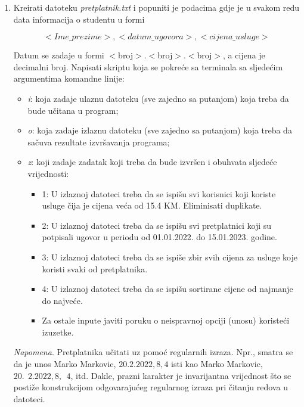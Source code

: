 \begin{enumerate}
   \item Kreirati datoteku \emph{pretplatnik.txt} i popuniti je podacima gdje je u svakom redu
   data informacija o studentu u formi
   
   $$<Ime\_prezime>, <datum\_ugovora>, <cijena\_usluge>$$
   
   Datum se zadaje u formi $<$broj$>$.$<$broj$>$.$<$broj$>$, a cijena je decimalni broj. Napisati 
   skriptu koja se pokreće sa terminala sa sljedećim argumentima komandne linije:
   \begin{itemize}
   	\item \textit{i}: koja zadaje ulaznu datoteku (sve zajedno sa putanjom) koja treba da bude učitana
   u program;
   \item \textit{o}: koja zadaje izlaznu datoteku (sve zajedno sa putanjom) koja treba da sačuva
   rezultate izvršavanja programa;
    \item \textit{z}: koji zadaje zadatak koji treba da bude izvršen i obuhvata sljedeće vrijednosti:
    \begin{itemize}
    	\item  1: U izlaznoj datoteci treba da se ispišu svi korisnici koji koriste usluge čija je  cijena veća od 15.4 KM. Eliminisati duplikate. 
        \item 2: U izlaznoj datoteci treba da se ispišu svi pretplatnici koji su potpisali ugovor u periodu od 01.01.2022. do 15.01.2023. godine.
        \item  3: U izlaznoj datoteci treba da se ispiše zbir svih cijena za usluge koje koristi svaki od pretplatnika. 
        \item 4: U izlaznoj datoteci treba da se ispišu sortirane cijene od najmanje do  najveće.
        \item Za ostale inpute javiti poruku o neispravnoj opciji  (unosu) koristeći izuzetke.
         \end{itemize}
   \end{itemize}
   \textit{Napomena}. Pretplatnika učitati uz pomoć regularnih izraza. Npr., smatra se da je unos Marko
   Markovic, $20.2.2022, 8,4$ isti kao Marko Markovic, $20.\ \ 2.2022, 8,\ \ 4$, itd. Dakle, prazni
   karakter je invarijantna vrijednost što se postiže konstrukcijom odgovarajućeg regularnog izraza
   pri čitanju redova u datoteci.
\end{enumerate}